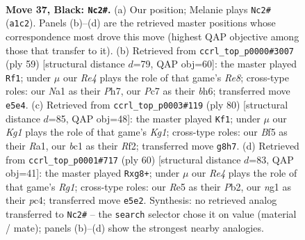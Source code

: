 \documentclass[11pt]{article}
\begin{document}
\clearpage

\begin{figure}[p]\centering
\begin{subfigure}{0.46\textwidth}\centering
\resizebox{\linewidth}{!}{%
\newchessgame
\chessboard[
  setfen={6k1/p1p2pp1/7p/4rb1P/p1P3n1/3r4/4R3/n1B1KBN1 b - - 5 37},
  showmover=false,
  pgfstyle=straightmove, color=movearrow, markmove={a1-c2}
]}
\caption{}
\end{subfigure}\hfill
\begin{subfigure}{0.46\textwidth}\centering
\resizebox{\linewidth}{!}{%
\newchessgame
\chessboard[
  setfen={2k5/2p4p/pp5B/5p2/2P5/3N1P1b/PPn4P/4r1RK b - - 1 30},
  showmover=false,
  pgfstyle=straightmove, color=movearrow, markmove={e1-f1}
]}
\caption{}
\end{subfigure}
\\[4pt]
\begin{subfigure}{0.46\textwidth}\centering
\resizebox{\linewidth}{!}{%
\newchessgame
\chessboard[
  setfen={1r6/4r1k1/6bn/2N5/2NnB1p1/3P2Pp/5R1P/R5K1 w - - 1 41},
  showmover=false,
  pgfstyle=straightmove, color=movearrow, markmove={g1-f1}
]}
\caption{}
\end{subfigure}\hfill
\begin{subfigure}{0.46\textwidth}\centering
\resizebox{\linewidth}{!}{%
\newchessgame
\chessboard[
  setfen={6rk/1b1B1p2/1P5p/p7/N1pb3P/P7/1P6/2K3R1 w - - 0 31},
  showmover=false,
  pgfstyle=straightmove, color=movearrow, markmove={g1-g8}
]}
\caption{}
\end{subfigure}
\caption{\textbf{Move 37, Black: \texttt{Nc2\#}.} (a) Our position; Melanie plays \texttt{Nc2\#} (\texttt{a1c2}). Panels (b)--(d) are the retrieved master positions whose correspondence most drove this move (highest QAP objective among those that transfer to it). (b) Retrieved from \texttt{ccrl\_top\_p0000\#3007} (ply 59) [structural distance $d$=79, QAP obj=60]: the master played \texttt{Rf1}; under $\mu$ our \emph{Re4} plays the role of that game's \emph{Re8}; cross-type roles: our \emph{N}a1 as their \emph{P}h7, our \emph{P}c7 as their \emph{b}h6; transferred move \texttt{e5e4}. (c) Retrieved from \texttt{ccrl\_top\_p0003\#119} (ply 80) [structural distance $d$=85, QAP obj=48]: the master played \texttt{Kf1}; under $\mu$ our \emph{Kg1} plays the role of that game's \emph{Kg1}; cross-type roles: our \emph{B}f5 as their \emph{R}a1, our \emph{b}c1 as their \emph{R}f2; transferred move \texttt{g8h7}. (d) Retrieved from \texttt{ccrl\_top\_p0001\#717} (ply 60) [structural distance $d$=83, QAP obj=41]: the master played \texttt{Rxg8+}; under $\mu$ our \emph{Re4} plays the role of that game's \emph{Rg1}; cross-type roles: our \emph{R}e5 as their \emph{P}b2, our \emph{n}g1 as their \emph{p}c4; transferred move \texttt{e5e2}. Synthesis: no retrieved analog transferred to \texttt{Nc2\#} -- the \texttt{search} selector chose it on value (material / mate); panels (b)--(d) show the strongest nearby analogies.}
\label{fig:thought-m73}
\end{figure}
\end{document}
